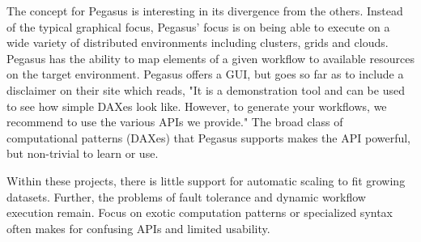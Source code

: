 	The concept for Pegasus \cite{pegasus} is interesting in its divergence from the others. Instead of the typical graphical focus, Pegasus' focus is on being able to execute on a wide variety of distributed environments including clusters, grids and clouds. Pegasus has the ability to map elements of a given workflow to available resources on the target environment. Pegasus offers a GUI, but goes so far as to include a disclaimer on their site which reads, "It is a demonstration tool and can be used to see how simple DAXes look like. However, to generate your workflows, we recommend to use the various APIs we provide." The broad class of computational patterns (DAXes) that Pegasus supports makes the API powerful, but non-trivial to learn or use. 
	
	Within these projects, there is little support for automatic scaling to fit growing datasets. Further, the problems of fault tolerance  and dynamic workflow execution remain. Focus on exotic computation patterns or specialized syntax often makes for confusing APIs and limited usability. 
	
	
\label{sec:related} 
